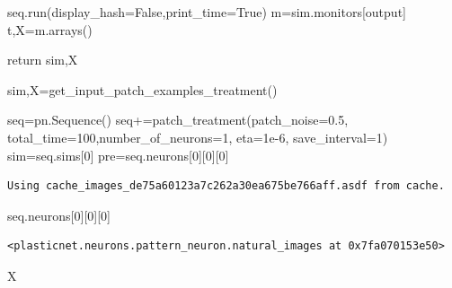 \documentclass[
  letterpaper,
  number]{elsarticle}
\newenvironment{Shaded}{\begin{snugshade}}{\end{snugshade}}
\newcommand{\ControlFlowTok}[1]{\textcolor[rgb]{0.00,0.23,0.31}{#1}}
\newcommand{\DecValTok}[1]{\textcolor[rgb]{0.68,0.00,0.00}{#1}}
\newcommand{\FloatTok}[1]{\textcolor[rgb]{0.68,0.00,0.00}{#1}}
\newcommand{\NormalTok}[1]{\textcolor[rgb]{0.00,0.23,0.31}{#1}}
\newcommand{\OperatorTok}[1]{\textcolor[rgb]{0.37,0.37,0.37}{#1}}
\newcommand{\StringTok}[1]{\textcolor[rgb]{0.13,0.47,0.30}{#1}}
\newcommand{\VariableTok}[1]{\textcolor[rgb]{0.07,0.07,0.07}{#1}}
\begin{document}
\begin{Shaded}
\begin{Highlighting}[]
\NormalTok{    seq.run(display\_hash}\OperatorTok{=}\VariableTok{False}\NormalTok{,print\_time}\OperatorTok{=}\VariableTok{True}\NormalTok{)}
\NormalTok{    m}\OperatorTok{=}\NormalTok{sim.monitors[}\StringTok{\textquotesingle{}output\textquotesingle{}}\NormalTok{]}
\NormalTok{    t,X}\OperatorTok{=}\NormalTok{m.arrays()    }
    
    \ControlFlowTok{return}\NormalTok{ sim,X}

\NormalTok{sim,X}\OperatorTok{=}\NormalTok{get\_input\_patch\_examples\_treatment()}
\end{Highlighting}
\end{Shaded}

\begin{Shaded}
\begin{Highlighting}[]
\NormalTok{    seq}\OperatorTok{=}\NormalTok{pn.Sequence()    }
\NormalTok{    seq}\OperatorTok{+=}\NormalTok{patch\_treatment(patch\_noise}\OperatorTok{=}\FloatTok{0.5}\NormalTok{,}
\NormalTok{               total\_time}\OperatorTok{=}\DecValTok{100}\NormalTok{,number\_of\_neurons}\OperatorTok{=}\DecValTok{1}\NormalTok{,}
\NormalTok{               eta}\OperatorTok{=}\FloatTok{1e{-}6}\NormalTok{,}
\NormalTok{               save\_interval}\OperatorTok{=}\DecValTok{1}\NormalTok{)}
\NormalTok{    sim}\OperatorTok{=}\NormalTok{seq.sims[}\DecValTok{0}\NormalTok{]}
\NormalTok{    pre}\OperatorTok{=}\NormalTok{seq.neurons[}\DecValTok{0}\NormalTok{][}\DecValTok{0}\NormalTok{][}\DecValTok{0}\NormalTok{]}
\end{Highlighting}
\end{Shaded}

\begin{verbatim}
Using cache_images_de75a60123a7c262a30ea675be766aff.asdf from cache.
\end{verbatim}

\begin{Shaded}
\begin{Highlighting}[]
\NormalTok{seq.neurons[}\DecValTok{0}\NormalTok{][}\DecValTok{0}\NormalTok{][}\DecValTok{0}\NormalTok{]}
\end{Highlighting}
\end{Shaded}

\begin{verbatim}
<plasticnet.neurons.pattern_neuron.natural_images at 0x7fa070153e50>
\end{verbatim}

\begin{Shaded}
\begin{Highlighting}[]
\NormalTok{X}
\end{Highlighting}
\end{Shaded}
\end{document}
